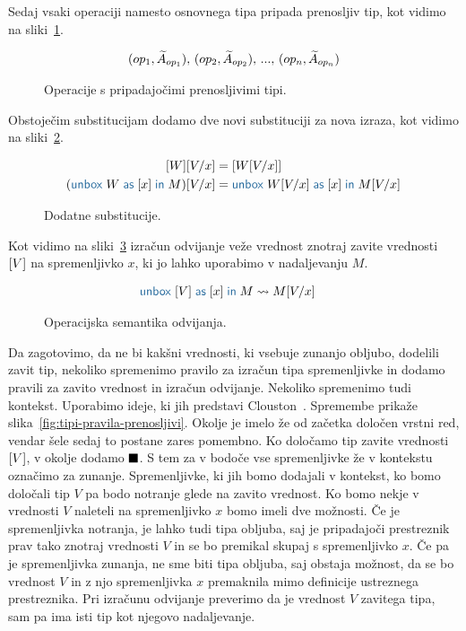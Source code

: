 Sedaj vsaki operaciji namesto osnovnega tipa pripada prenosljiv tip, kot vidimo na sliki~\ref{fig:prenosljive-operacije}.

\begin{figure}[H]
	\centering
	\small
	\begin{align*}
	(op_1, \widetilde{A}_{op_1}),\, (op_2, \widetilde{A}_{op_2}),\, ... ,\, (op_n, \widetilde{A}_{op_n})
	\end{align*}
	\vspace{-5ex}
	\caption{Operacije s pripadajočimi prenosljivimi tipi.}
	\label{fig:prenosljive-operacije}
\end{figure}

Obstoječim substitucijam dodamo dve novi substituciji za nova izraza, kot vidimo na sliki~\ref{fig:substitucija-box}.

\begin{figure}[H]
	\centering
	\small
	\begin{align*}
		\tmboxed{W}[V/x] &= \tmboxed{W[V/x]} \\
		(\tmunbox{W}{x}{M})[V/x] &= \tmunbox{W[V/x]}{x}{M[V/x]}
	\end{align*}
	\vspace{-5ex}
	\caption{Dodatne substitucije.}
	\label{fig:substitucija-box}
\end{figure}

Kot vidimo na sliki~\ref{fig:semantika-odvijanje} izračun odvijanje veže vrednost znotraj zavite vrednosti $[V]$ na spremenljivko $x$, ki jo lahko uporabimo v nadaljevanju $M$.

\begin{figure}[h]
	\centering
	\small
	\begin{align*}
	\tmunbox{[V]}{x}{M} &\reduces M[V/x]
	\end{align*}
	
	\caption{Operacijska semantika odvijanja.}
	\label{fig:semantika-odvijanje}
\end{figure}


Da zagotovimo, da ne bi kakšni vrednosti, ki vsebuje zunanjo obljubo, dodelili zavit tip, nekoliko spremenimo pravilo za izračun tipa spremenljivke in dodamo pravili za zavito vrednost in izračun odvijanje. Nekoliko spremenimo tudi kontekst. Uporabimo ideje, ki jih predstavi Clouston~\cite{fitch}. Spremembe prikaže slika~\ref{fig:tipi-pravila-prenosljivi}.
Okolje je imelo že od začetka določen vrstni red, vendar šele sedaj to postane zares pomembno. 
Ko določamo tip zavite vrednosti $[V]$, v okolje dodamo $\blacksquare$. S tem za v bodoče vse spremenljivke že v kontekstu označimo za zunanje. Spremenljivke, ki jih bomo dodajali v kontekst, ko bomo določali tip $V$ pa bodo notranje glede na zavito vrednost. Ko bomo nekje v vrednosti $V$ naleteli na spremenljivko $x$ bomo imeli dve možnosti. Če je spremenljivka notranja, je lahko tudi tipa obljuba, saj je pripadajoči prestreznik prav tako znotraj vrednosti $V$ in se bo premikal skupaj s spremenljivko $x$. Če pa je spremenljivka zunanja, ne sme biti tipa obljuba, saj obstaja možnost, da se bo vrednost $V$ in z njo spremenljivka $x$ premaknila mimo definicije ustreznega prestreznika.
Pri izračunu odvijanje preverimo da je vrednost $V$ zavitega tipa, sam pa ima isti tip kot njegovo nadaljevanje.

